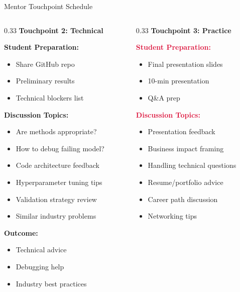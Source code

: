 \begin{frame}{Mentor Touchpoint Schedule}
\begin{columns}
\begin{column}{0.33\textwidth}
\textbf{Touchpoint 2: Technical}

\textcolor{navyblue}{\textbf{Student Preparation:}}
\begin{itemize}
\item Share GitHub repo
\item Preliminary results
\item Technical blockers list
\end{itemize}

\textcolor{navyblue}{\textbf{Discussion Topics:}}
\begin{itemize}
\item Are methods appropriate?
\item How to debug failing model?
\item Code architecture feedback
\item Hyperparameter tuning tips
\item Validation strategy review
\item Similar industry problems
\end{itemize}

\textcolor{navyblue}{\textbf{Outcome:}}
\begin{itemize}
\item Technical advice
\item Debugging help
\item Industry best practices
\end{itemize}
\end{column}

\begin{column}{0.33\textwidth}
\textbf{Touchpoint 3: Practice}

\textcolor{crimson}{\textbf{Student Preparation:}}
\begin{itemize}
\item Final presentation slides
\item 10-min presentation
\item Q\&A prep
\end{itemize}

\textcolor{crimson}{\textbf{Discussion Topics:}}
\begin{itemize}
\item Presentation feedback
\item Business impact framing
\item Handling technical questions
\item Resume/portfolio advice
\item Career path discussion
\item Networking tips
\end{itemize}


\end{column}
\end{columns}
\end{frame}
